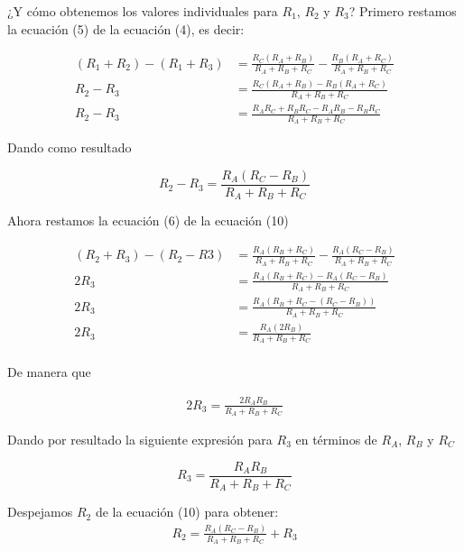 \documentclass{article}
\begin{document}
¿Y cómo obtenemos los valores individuales para $R_1$, $R_2$ y $R_3$? Primero restamos la ecuación (5) de la ecuación (4), es decir:

\begin{align}
	(R_1 + R_2) - (R_1 + R_3) &= \frac{R_C (R_A + R_B)}{R_A + R_B + R_C} - \frac{R_B (R_A + R_C)}{R_A + R_B + R_C} \\
	R_2 - R_3 &= \frac{R_C(R_A + R_B) - R_B(R_A + R_C)}{R_A + R_B + R_C} \\
	R_2 - R_3 &= \frac{R_AR_C + R_BR_C - R_AR_B - R_BR_C}{R_A + R_B + R_C}
\end{align}

Dando como resultado
\begin{tcolorbox}[colback=red!5!white,colframe=red!75!black,arc=0mm,boxrule=0mm,width=(\linewidth+0.5cm)]
	\begin{equation}
		R_2 - R_3 = \frac{R_A(R_C - R_B)}{R_A + R_B + R_C}
	\end{equation}
\end{tcolorbox}

Ahora restamos la ecuación (6) de la ecuación (10)

\begin{align}
	(R_2 + R_3) - (R_2 - R3) &=  \frac{R_A (R_B + R_C)}{R_A + R_B + R_C} - \frac{R_A(R_C - R_B)}{R_A + R_B + R_C} \\
	2R_3 &= \frac{R_A(R_B + R_C) - R_A(R_C - R_B)}{R_A + R_B + R_C} \\
	2R_3 &= \frac{R_A(R_B + R_C - (R_C - R_B))}{R_A + R_B + R_C} \\
	2R_3 &= \frac{R_A(2R_B)}{R_A + R_B + R_C} \\
\end{align}

De manera que

\begin{align}
	2R_3 = \frac{2R_AR_B}{R_A + R_B + R_C}
\end{align}

Dando por resultado la siguiente expresión para $R_3$ en términos de $R_A$, $R_B$ y $R_C$

\begin{tcolorbox}[colback=red!5!white,colframe=red!75!black,arc=0mm,boxrule=0mm,width=(\linewidth+0.5cm)]
	\begin{equation}
		R_3 = \frac{R_AR_B}{R_A + R_B + R_C}
	\end{equation}
\end{tcolorbox}

Despejamos $R_2$ de la ecuación (10) para obtener:
\begin{align}
	R_2 = \frac{R_A(R_C - R_B)}{R_A + R_B + R_C} + R_3
\end{align}
\end{document}
